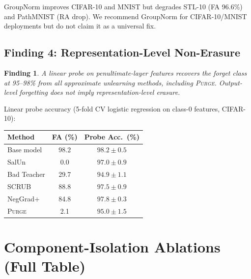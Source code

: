 \documentclass[letterpaper]{article}
\newcommand{\ours}{\textsc{Purge}}
\newtheorem{finding}{Finding}
\begin{document}
GroupNorm improves CIFAR-10 and MNIST but degrades STL-10 (FA 96.6\%) and PathMNIST (RA drop). We recommend GroupNorm for CIFAR-10/MNIST deployments but do not claim it as a universal fix.

\subsection{Finding 4: Representation-Level Non-Erasure}

\begin{finding}
A linear probe on penultimate-layer features recovers the forget class at 95--98\% from all approximate unlearning methods, including \ours{}. Output-level forgetting does not imply representation-level erasure.
\end{finding}

Linear probe accuracy (5-fold CV logistic regression on class-0 features, CIFAR-10):

\begin{center}
\small
\begin{tabular}{lcc}
\toprule
\textbf{Method} & \textbf{FA (\%)} & \textbf{Probe Acc.\ (\%)} \\
\midrule
Base model & 98.2 & $98.2 \pm 0.5$ \\
SalUn & 0.0 & $97.0 \pm 0.9$ \\
Bad Teacher & 29.7 & $94.9 \pm 1.1$ \\
SCRUB & 88.8 & $97.5 \pm 0.9$ \\
NegGrad+ & 84.8 & $97.8 \pm 0.3$ \\
\ours{} & 2.1 & $95.0 \pm 1.5$ \\
\bottomrule
\end{tabular}
\end{center}

\section{Component-Isolation Ablations (Full Table)}
\end{document}
